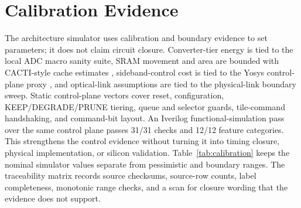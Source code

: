 \documentclass[10pt,journal]{IEEEtran}
\begin{document}
\section{Calibration Evidence}

The architecture simulator uses calibration and boundary evidence to set
parameters; it does not claim circuit closure. Converter-tier energy is tied to
the local ADC macro sanity suite, SRAM movement and area are bounded with
CACTI-style cache estimates \cite{cacti}, sideband-control cost is tied to the
Yosys control-plane proxy \cite{yosys}, and optical-link assumptions are tied to
the physical-link boundary sweep. Static control-plane vectors cover reset,
configuration, KEEP/DEGRADE/PRUNE tiering, queue and selector guards,
tile-command handshaking, and command-bit layout. An Iverilog
functional-simulation pass over the same control plane passes 31/31 checks and
12/12 feature categories. This strengthens the control evidence without turning
it into timing closure, physical implementation, or silicon validation.
Table~\ref{tab:calibration} keeps the nominal simulator values separate from
pessimistic and boundary ranges. The traceability matrix records source
checksums, source-row counts, label completeness, monotonic range checks, and a
scan for closure wording that the evidence does not support.
\end{document}
